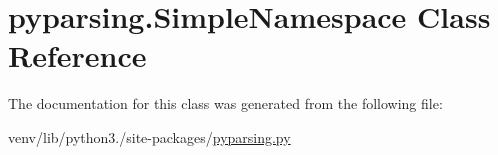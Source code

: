 \hypertarget{classpyparsing_1_1SimpleNamespace}{}\section{pyparsing.\+Simple\+Namespace Class Reference}
\label{classpyparsing_1_1SimpleNamespace}


The documentation for this class was generated from the following file\+:\begin{DoxyCompactItemize}
\item 
venv/lib/python3./site-\/packages/\hyperlink{pyparsing_8py}{pyparsing.\+py}\end{DoxyCompactItemize}
